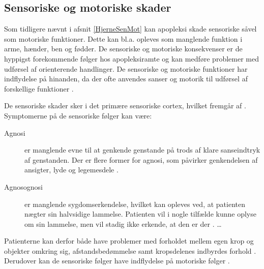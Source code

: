 \subsection{Sensoriske og motoriske skader} %
Som tidligere nævnt i afsnit \ref{HjerneSenMot} kan apopleksi skade sensoriske såvel som motoriske funktioner. Dette kan bl.a. opleves som manglende funktion i arme, hænder, ben og fødder. De sensoriske og motoriske konsekvenser er de hyppigst forekommende følger hos apopleksiramte og kan medføre problemer med udførsel af orienterende handlinger. \cite{Sundhed.dk,DSfA2009}  De sensoriske og motoriske funktioner har indflydelse på hinanden, da der ofte anvendes sanser og motorik til udførsel af forskellige funktioner \cite{Nichols1997}. 

De sensoriske skader sker i det primære sensoriske cortex, hvilket fremgår af . Symptomerne på de sensoriske følger kan være:
\begin{description}
  \item[Agnosi] er manglende evne til at genkende genstande på trods af klare sanseindtryk af genstanden. Der er flere former for agnosi, som påvirker genkendelsen af ansigter, lyde og legemesdele \cite{Redaktionen2015}. 
 \item[Agnosognosi] er manglende sygdomserkendelse, hvilket kan opleves ved, at patienten nægter sin halvsidige lammelse. Patienten vil i nogle tilfælde kunne oplyse om sin lammelse, men vil stadig ikke erkende, at den er der \cite{Pedersen1999}.
  \ldots
\end{description}
Patienterne kan derfor både have problemer med forholdet mellem egen krop og objekter omkring sig, afstandsbedømmelse samt kropsdelenes indbyrdes forhold \cite{Sundhed.dk,DSfA2009}. Derudover kan de sensoriske følger have indflydelse på motoriske følger \cite{Nichols1997}. 

